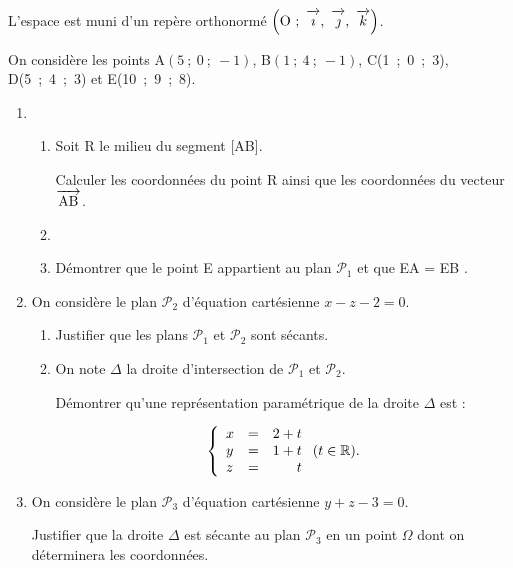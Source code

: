 \documentclass[11pt,a4paper,french]{article}
\newcommand{\R}{\mathbb{R}}
\newcommand{\vect}[1]{\overrightarrow{\,\mathstrut#1\,}}
\def\Oijk{$\left(\text{O}~;~\vect{\imath},~\vect{\jmath},~\vect{k}\right)$}
\begin{document}
\medskip

L'espace est muni d'un repère orthonormé \Oijk.

On considère les points A$(5~;~0~;~-1)$, B$(1~;~4~;~-1)$, C(1~;~0~;~3), D(5~;~4~;~3) et E(10~;~9~;~8).

\medskip

\begin{enumerate}
\item 
	\begin{enumerate}
		\item Soit R le milieu du segment [AB].
		
Calculer les coordonnées du point R ainsi que les coordonnées du vecteur $\vect{\text{AB}}$.
		\item %





		\item Démontrer que le point E appartient au plan $\mathcal{P}_1$ et que EA = EB .
	\end{enumerate}	
\item  On considère le plan $\mathcal{P}_2$ d'équation cartésienne $x - z - 2 = 0$. 
	\begin{enumerate}
		\item Justifier que les plans $\mathcal{P}_1$ et $\mathcal{P}_2$ sont sécants.
		\item On note $\Delta$ la droite d'intersection de $\mathcal{P}_1$ et $\mathcal{P}_2$.
		
Démontrer qu'une représentation paramétrique de la droite $\Delta$ est :

\[\left\{\begin{array}{l c r}
x&=&2+t\\
y&=&1+t \\
z&=&t\end{array}\right.(t \in \R).\]

	\end{enumerate}
\item  On considère le plan $\mathcal{P}_3$ d'équation cartésienne $y + z - 3 = 0$.

Justifier que la droite $\Delta$ est sécante au plan $\mathcal{P}_3$ en un point $\Omega$ dont on déterminera les coordonnées.
\end{enumerate}

\medskip
\end{document}
